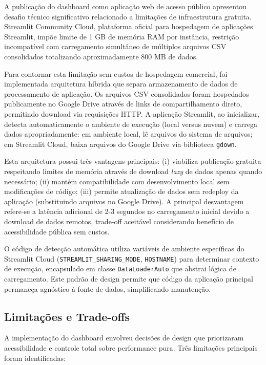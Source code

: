 A publicação do dashboard como aplicação web de acesso público apresentou desafio técnico significativo relacionado a limitações de infraestrutura gratuita. Streamlit Community Cloud, plataforma oficial para hospedagem de aplicações Streamlit, impõe limite de 1 GB de memória RAM por instância, restrição incompatível com carregamento simultâneo de múltiplos arquivos CSV consolidados totalizando aproximadamente 800 MB de dados.

Para contornar esta limitação sem custos de hospedagem comercial, foi implementada arquitetura híbrida que separa armazenamento de dados de processamento de aplicação. Os arquivos CSV consolidados foram hospedados publicamente no Google Drive através de links de compartilhamento direto, permitindo download via requisições HTTP. A aplicação Streamlit, ao inicializar, detecta automaticamente o ambiente de execução (local versus nuvem) e carrega dados apropriadamente: em ambiente local, lê arquivos do sistema de arquivos; em Streamlit Cloud, baixa arquivos do Google Drive via biblioteca \texttt{gdown}.

Esta arquitetura possui três vantagens principais: (i) viabiliza publicação gratuita respeitando limites de memória através de download \textit{lazy} de dados apenas quando necessário; (ii) mantém compatibilidade com desenvolvimento local sem modificações de código; (iii) permite atualização de dados sem redeploy da aplicação (substituindo arquivos no Google Drive). A principal desvantagem refere-se a latência adicional de 2-3 segundos no carregamento inicial devido a download de dados remotos, trade-off aceitável considerando benefício de acessibilidade pública sem custos.

O código de detecção automática utiliza variáveis de ambiente específicas do Streamlit Cloud (\texttt{STREAMLIT\_SHARING\_MODE}, \texttt{HOSTNAME}) para determinar contexto de execução, encapsulado em classe \texttt{DataLoaderAuto} que abstrai lógica de carregamento. Este padrão de design permite que código da aplicação principal permaneça agnóstico à fonte de dados, simplificando manutenção.

\subsection{Limitações e Trade-offs}

A implementação do dashboard envolveu decisões de design que priorizaram acessibilidade e controle total sobre performance pura. Três limitações principais foram identificadas:

